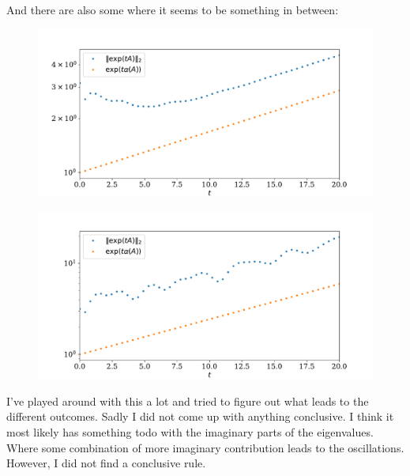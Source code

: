 \documentclass[a4paper, 11pt]{article}
\begin{document}
And there are also some where it seems to be something in between:
\begin{figure}[H]
  \centering
  \includegraphics[width=\textwidth]{../24_3/damped.pdf}
\end{figure}
\begin{figure}[H]
  \centering
  \includegraphics[width=\textwidth]{../24_3/weird.pdf}
\end{figure}

I've played around with this a lot and tried to figure out what leads to the
different outcomes. Sadly I did not come up with anything conclusive. I think
it most likely has something todo with the imaginary parts of the eigenvalues.
Where some combination of more imaginary contribution leads to the
oscillations. However, I did not find a conclusive rule. 
\end{document}
